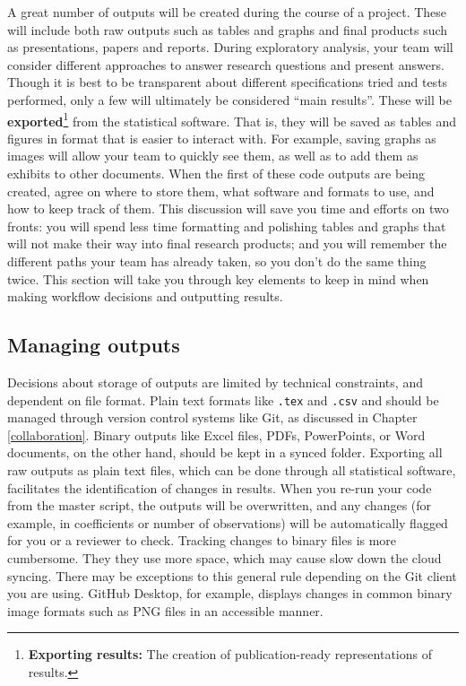 \documentclass[
]{book}
\begin{document}
A great number of outputs will be created during the course of a project.
These will include both raw outputs such as tables and graphs
and final products such as presentations, papers and reports.
During exploratory analysis, your team will consider different approaches
to answer research questions and present answers.
Though it is best to be transparent about different
specifications tried and tests performed,
only a few will ultimately be considered ``main results''.
These will be \textbf{exported}\footnote{\textbf{Exporting results:} The creation of publication-ready representations of results.}
from the statistical software.
That is, they will be saved as tables and figures in format that is easier to interact with.
For example, saving graphs as images will allow your team to quickly see them,
as well as to add them as exhibits to other documents.
When the first of these code outputs are being created, agree on where to store them,
what software and formats to use, and how to keep track of them.
This discussion will save you time and efforts on two fronts:
you will spend less time formatting and polishing tables and graphs that
will not make their way into final research products;
and you will remember the different paths your team has already
taken, so you don't do the same thing twice.
This section will take you through key elements to keep in mind
when making workflow decisions and outputting results.

\hypertarget{managing-outputs}{%
\subsection*{Managing outputs}\label{managing-outputs}}

Decisions about storage of outputs are limited by technical constraints,
and dependent on file format.
Plain text formats like \texttt{.tex} and \texttt{.csv}
and should be managed through version control systems like Git,
as discussed in Chapter \ref{collaboration}.
Binary outputs like Excel files, PDFs, PowerPoints, or Word documents,
on the other hand, should be kept in a synced folder.
Exporting all raw outputs as plain text files,
which can be done through all statistical software,
facilitates the identification of changes in results.
When you re-run your code from the master script,
the outputs will be overwritten,
and any changes (for example, in coefficients or number of observations)
will be automatically flagged for you or a reviewer to check.
Tracking changes to binary files is more cumbersome.
They they use more space,
which may cause slow down the cloud syncing.
There may be exceptions to this general rule
depending on the Git client you are using.
GitHub Desktop, for example,
displays changes in common binary image formats such as PNG files
in an accessible manner.
\end{document}
